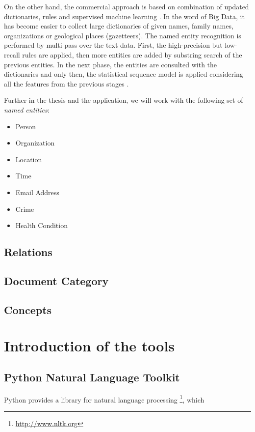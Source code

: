 \documentclass[
  digital, %
  table,   %
  lof,     %
  lot,     %
]{fithesis3}
\begin{document}
On the other hand, the commercial approach is based on combination of updated dictionaries, rules and supervised machine learning \cite{chiticariu2013rule}.
In the word of Big Data, it has become easier to collect large dictionaries of given names, family names, organizations or geological places (gazetteers).
The named entity recognition is performed by multi pass over the text data.
First, the high-precision but low-recall rules are applied, then more entities are added by substring search of the previous entities.
In the next phase, the entities are consulted with the dictionaries and only then, the statistical sequence model is applied considering all the features from the previous stages \cite[ch. 21]{jurafsky2014speech}.

Further in the thesis and the application, we will work with the following set of \textit{named entities}:
\begin{itemize}
\item Person
\item Organization
\item Location
\item Time
\item Email Address
\item Crime
\item Health Condition
\end{itemize}

\subsection{Relations}

\subsection{Document Category}

\subsection{Concepts}

\section{Introduction of the tools}

\subsection{Python Natural Language Toolkit}
Python provides a library for natural language processing \footnote{\url{http://www.nltk.org}}, which 
\end{document}
